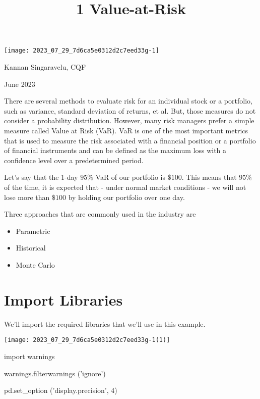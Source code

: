 \documentclass[10pt]{article}
\title{1 Value-at-Risk }
\author{}
\date{}
\begin{document}
\maketitle
\begin{center}
\texttt{[image: 2023\_07\_29\_7d6ca5e0312d2c7eed33g-1]}
\end{center}

Kannan Singaravelu, CQF

June 2023

There are several methods to evaluate risk for an individual stock or a portfolio, such as variance, standard deviation of returns, et al. But, those measures do not consider a probability distribution. However, many risk managers prefer a simple measure called Value at Risk (VaR). VaR is one of the most important metrics that is used to measure the risk associated with a financial position or a portfolio of financial instruments and can be defined as the maximum loss with a confidence level over a predetermined period.

Let's say that the 1-day $95 \%$ VaR of our portfolio is $\$ 100$. This means that $95 \%$ of the time, it is expected that - under normal market conditions - we will not lose more than $\$ 100$ by holding our portfolio over one day.

Three approaches that are commonly used in the industry are

\begin{itemize}
  \item Parametric

  \item Historical

  \item Monte Carlo

\end{itemize}

\section*{Import Libraries}
We'll import the required libraries that we'll use in this example.

\begin{center}
\texttt{[image: 2023\_07\_29\_7d6ca5e0312d2c7eed33g-1(1)]}
\end{center}

import warnings

warnings.filterwarnings ('ignore')

pd.set\_option ('display.precision', 4)
\end{document}
